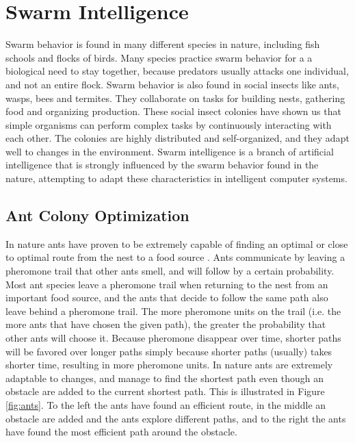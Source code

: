 \section{Swarm Intelligence}
\label{sec:swarmIntelligence}
Swarm behavior is found in many different species in nature, including fish schools and flocks of birds. Many species practice swarm behavior for a a biological need to stay together, because predators usually attacks one individual, and not an entire flock. Swarm behavior is also found in social insects like ants, wasps, bees and termites. They collaborate on tasks for building nests, gathering food and organizing production. These social insect colonies have shown us that simple organisms can perform complex tasks by continuously interacting with each other. The colonies are highly distributed and self-organized, and they adapt well to changes in the environment. Swarm intelligence \citep{beni89} is a branch of artificial intelligence that is strongly influenced by the swarm behavior found in the nature, attempting to adapt these characteristics in intelligent computer systems.

\subsection{Ant Colony Optimization}
In nature ants have proven to be extremely capable of finding an optimal or close to optimal route from the nest to a food source \citep{deneubourg90}. Ants communicate by leaving a pheromone trail that other ants smell, and will follow by a certain probability. Most ant species leave a pheromone trail when returning to the nest from an important food source, and the ants that decide to follow the same path also leave behind a pheromone trail. The more pheromone units on the trail (i.e. the more ants that have chosen the given path), the greater the probability that other ants will choose it. Because pheromone disappear over time, shorter paths will be favored over longer paths simply because shorter paths (usually) takes shorter time, resulting in more pheromone units. In nature ants are extremely adaptable to changes, and manage to find the shortest path even though an obstacle are added to the current shortest path. This is illustrated in Figure \ref{fig:ants}. To the left the ants have found an efficient route, in the middle an obstacle are added and the ants explore different paths, and to the right the ants have found the most efficient path around the obstacle. 

